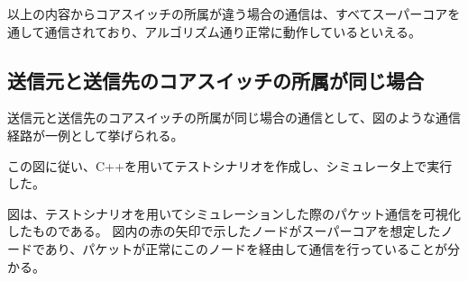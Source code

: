 以上の内容からコアスイッチの所属が違う場合の通信は、すべてスーパーコアを通して通信されており、アルゴリズム通り正常に動作しているといえる。

\subsection{送信元と送信先のコアスイッチの所属が同じ場合}

送信元と送信先のコアスイッチの所属が同じ場合の通信として、図のような通信経路が一例として挙げられる。

この図に従い、C++を用いてテストシナリオを作成し、シミュレータ上で実行した。



図は、テストシナリオを用いてシミュレーションした際のパケット通信を可視化したものである。
図内の赤の矢印で示したノードがスーパーコアを想定したノードであり、パケットが正常にこのノードを経由して通信を行っていることが分かる。

\begin{comment}
\begin{figure}[tb]
\begin{center}
\begin{tabular}{c}

\begin{minipage}{0.4\hsize}
\begin{center}
\texttt{[image: ./lena.eps]}
\hspace{1.6cm} [1]通常画像
\end{center}
\end{minipage}

\begin{minipage}{0.4\hsize}
\begin{center}
\texttt{[image: ./lena-affine.eps]}
\hspace{1.6cm} [2]アフィン変換(90度回転)
\end{center}
\end{minipage}

\end{tabular}
\caption{画像の変換例}
\label{fig:4-3}
\end{center}
\end{figure}
\end{comment}

